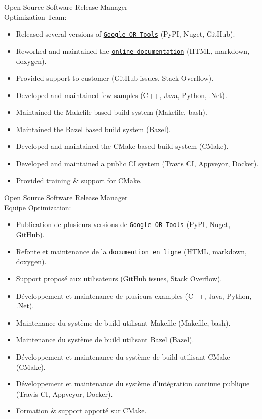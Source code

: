 \documentclass{article}
\begin{document}
\begin{llist}
\vspace{-0.60cm}
 {
} {
}
 {
Open Source Software Release Manager\\
Optimization Team:
\vspace{-0.50cm}
\begin{itemize}
	\item Released several versions of
    \href{https://github.com/google/or-tools}{\texttt{Google OR-Tools}} (PyPI, Nuget, GitHub).
	\item Reworked and maintained the
    \href{https://developers.google.com/optimization/}{\texttt{online documentation}}
    (HTML, markdown, doxygen).
	\item Provided support to customer (GitHub issues, Stack Overflow).
	\item Developed and maintained few samples (C++, Java, Python, .Net).
	\item Maintained the Makefile based build system (Makefile, bash).
	\item Maintained the Bazel based build system (Bazel).
	\item Developed and maintained the CMake based build system (CMake).
	\item Developed and maintained a public CI system (Travis CI, Appveyor, Docker).
	\item Provided training \& support for CMake.
\end{itemize}
} {
Open Source Software Release Manager\\
Equipe Optimization:
\vspace{-0.50cm}
\begin{itemize}
	\item Publication de plusieurs versions de
		\href{https://github.com/google/or-tools}{\texttt{Google OR-Tools}} (PyPI, Nuget, GitHub).
  \item Refonte et maintenance de la
    \href{https://developers.google.com/optimization/}{\texttt{documention en ligne}}
    (HTML, markdown, doxygen).
  \item Support propos\'{e} aux utilisateurs (GitHub issues, Stack Overflow).
  \item D\'{e}veloppement et maintenance de plusieurs examples (C++, Java, Python, .Net).
  \item Maintenance du syst\`{e}me de build utilisant Makefile (Makefile, bash).
  \item Maintenance du syst\`{e}me de build utilisant Bazel (Bazel).
  \item D\'{e}veloppement et maintenance du syst\`{e}me de build utilisant CMake (CMake).
  \item D\'{e}veloppement et maintenance du syst\`{e}me d'int\'{e}gration continue publique (Travis CI, Appveyor, Docker).
  \item Formation \& support apport\'{e} sur CMake.
\end{itemize}
}


\end{llist}
\end{document}
